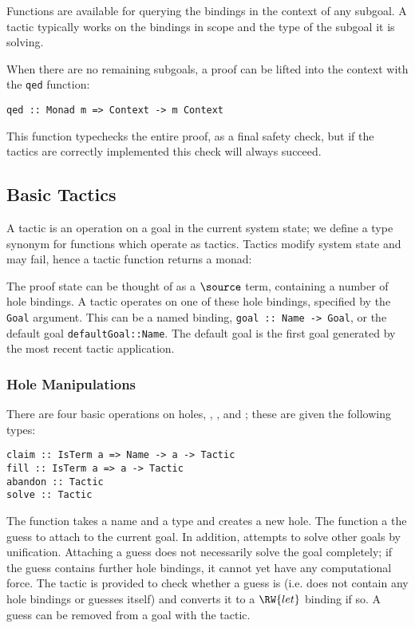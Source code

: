 Functions are available for querying the bindings in the context of
any subgoal. A tactic typically works on the bindings in scope and the
type of the subgoal it is solving.

When there are no remaining subgoals, a proof can be lifted into the
context with the \texttt{qed} function:

\begin{verbatim}
qed :: Monad m => Context -> m Context
\end{verbatim}

This function typechecks the entire proof, as a final safety check,
but if the tactics are correctly implemented this check will always succeed.

\subsection{Basic Tactics}

A tactic is an operation on a goal in the current system state; we
define a type synonym  for functions which operate as
tactics. Tactics modify system state and may fail, hence a tactic
function returns a monad:


The proof state can be thought of as a $\source$ term, containing a
number of hole bindings. A tactic operates on one of these hole
bindings, specified by the \texttt{Goal} argument. This can be a named
binding, \texttt{goal :: Name -> Goal}, or the default goal
\texttt{defaultGoal::Name}. The default goal is the first goal
generated by the most recent tactic application.

\subsubsection{Hole Manipulations}

There are four basic operations on holes, , ,
 and ; these are given the following types:
\begin{verbatim}
claim :: IsTerm a => Name -> a -> Tactic
fill :: IsTerm a => a -> Tactic
abandon :: Tactic
solve :: Tactic
\end{verbatim}

The  function takes a name and a type and creates a new
hole. The  function a the guess to attach to the current
goal. In addition,  attempts to solve other goals by
unification. Attaching a guess does not necessarily solve the goal
completely; if the guess contains further hole bindings, it cannot yet
have any computational force. The  tactic is provided to
check whether a guess is  (i.e. does not contain any hole
bindings or guesses itself) and converts it to a $\RW{let}$ binding if
so.  A guess can be removed from a goal with the 
tactic.

